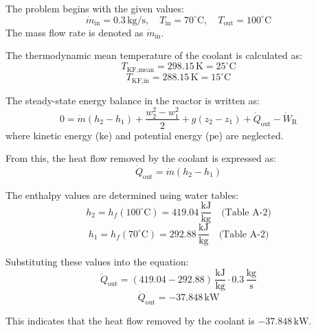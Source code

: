 The problem begins with the given values:  
\[
\dot{m}_{\text{in}} = 0.3 \, \text{kg/s}, \quad T_{\text{in}} = 70^\circ\text{C}, \quad T_{\text{out}} = 100^\circ\text{C}
\]  
The mass flow rate is denoted as \( \dot{m}_{\text{in}} \).  

The thermodynamic mean temperature of the coolant is calculated as:  
\[
T_{\text{KF,mean}} = 298.15 \, \text{K} = 25^\circ\text{C}
\]  
\[
T_{\text{KF,in}} = 288.15 \, \text{K} = 15^\circ\text{C}
\]  

The steady-state energy balance in the reactor is written as:  
\[
0 = \dot{m} (h_2 - h_1) + \frac{w_2^2 - w_1^2}{2} + g(z_2 - z_1) + \dot{Q}_{\text{out}} - \dot{W}_{\text{R}}
\]  
where kinetic energy (\( \text{ke} \)) and potential energy (\( \text{pe} \)) are neglected.  

From this, the heat flow removed by the coolant is expressed as:  
\[
\dot{Q}_{\text{out}} = \dot{m} (h_2 - h_1)
\]  

The enthalpy values are determined using water tables:  
\[
h_2 = h_f(100^\circ\text{C}) = 419.04 \, \frac{\text{kJ}}{\text{kg}} \quad \text{(Table A-2)}
\]  
\[
h_1 = h_f(70^\circ\text{C}) = 292.88 \, \frac{\text{kJ}}{\text{kg}} \quad \text{(Table A-2)}
\]  

Substituting these values into the equation:  
\[
\dot{Q}_{\text{out}} = (\text{419.04} - \text{292.88}) \, \frac{\text{kJ}}{\text{kg}} \cdot 0.3 \, \frac{\text{kg}}{\text{s}}
\]  
\[
\dot{Q}_{\text{out}} = -37.848 \, \text{kW}
\]  

This indicates that the heat flow removed by the coolant is \( -37.848 \, \text{kW} \).